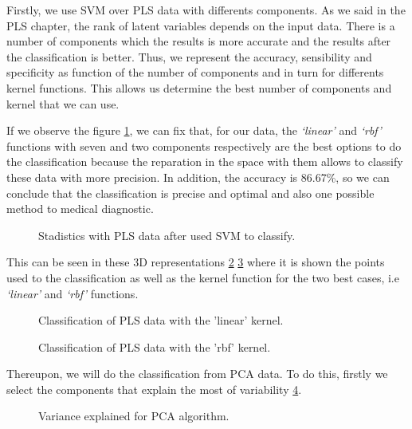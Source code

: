 Firstly, we use SVM over PLS data with differents components. As we said in the PLS chapter, the rank of latent variables depends on the input data. There is a number of components which the results is more accurate and the results after the classification is better. Thus, we represent the accuracy, sensibility and specificity as function of the number of components and in turn for differents kernel functions. This allows us determine the best number of components and  kernel that we can use.

If we observe the figure \ref{fig:stadistics_PLS}, we can fix that, for our data, the \textit{‘linear’} and \textit{‘rbf’} functions with seven and two components respectively are the best options to do the classification because the reparation in the space with them allows to classify these data with more precision.  In addition, the accuracy is 86.67\%, so we can conclude that the classification is precise and optimal and also one possible method to medical diagnostic.

\begin{figure}[H]
	\centering
	\caption{Stadistics with PLS data after used SVM to classify.}
	\label{fig:stadistics_PLS}
\end{figure}

This can be seen in these 3D representations \ref{fig:Classification3D_PLS_linear} \ref{fig:Classification3D_PLS_rbf} where it is shown the points used to the classification as well as the kernel function for the two best cases, i.e \textit{‘linear’} and \textit{‘rbf’} functions.

\begin{figure}[H]
	\centering
	\caption{Classification of PLS data with the 'linear' kernel.}
	\label{fig:Classification3D_PLS_linear}
\end{figure}

\begin{figure}[H]
	\centering
	\caption{Classification of PLS data with the 'rbf' kernel.}
	\label{fig:Classification3D_PLS_rbf}
\end{figure}

Thereupon, we will do the classification from PCA data. To do this, firstly we select the components that explain the most of variability \ref{fig:variance_PCA}.

\begin{figure}[H]
	\centering
	\caption{Variance explained for PCA algorithm.}
	\label{fig:variance_PCA}
\end{figure} 

